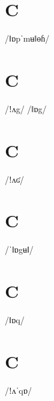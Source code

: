 \documentclass[10pt,a4paper,twoside]{book}
\begin{document}
\section*{C}

\begin{multicols}{3}
 {/ǁɒpˈmʉǁɵɦ/} {}
\end{multicols}

\section*{C}

\begin{multicols}{3}
 {/ǃʌg/} {}
 {/ǁɒg/} {}
\end{multicols}

\section*{C}

\begin{multicols}{3}
 {/ǃʌʛ/} {}
\end{multicols}

\section*{C}

\begin{multicols}{3}
 {/ˈǁɒgʉǁ/} {}
\end{multicols}

\section*{C}

\begin{multicols}{3}
 {/ǁɒq/} {}
\end{multicols}

\section*{C}

\begin{multicols}{3}
 {/ǃʌˈqɒ/} {}
\end{multicols}
\end{document}
